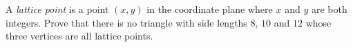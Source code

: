 A \emph{lattice point} is a point $(x,y)$ in the coordinate plane where $x$ and $y$ are both integers. Prove that there is no triangle with side lengths $8$, $10$ and $12$ whose three vertices are all lattice points.
